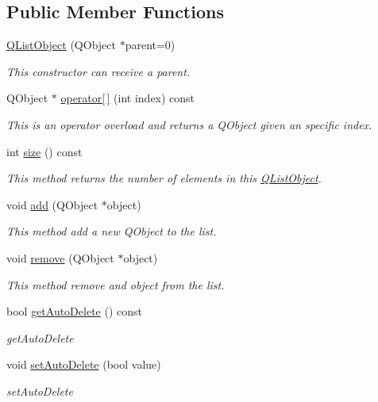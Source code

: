 \subsection*{Public Member Functions}
\begin{DoxyCompactItemize}
\item 
\mbox{\hyperlink{class_q_list_object_a83076620d8a83ebb0d2b2a4a8bd84e38}{Q\+List\+Object}} (Q\+Object $\ast$parent=0)
\begin{DoxyCompactList}\small\item\em This constructor can receive a parent. \end{DoxyCompactList}\item 
Q\+Object $\ast$ \mbox{\hyperlink{class_q_list_object_a6f07490df1b1ba2ed37c7f322e12017b}{operator\mbox{[}$\,$\mbox{]}}} (int index) const
\begin{DoxyCompactList}\small\item\em This is an operator overload and returns a Q\+Object given an specific index. \end{DoxyCompactList}\item 
int \mbox{\hyperlink{class_q_list_object_a4ded55097ea08fa5781240883a591216}{size}} () const
\begin{DoxyCompactList}\small\item\em This method returns the number of elements in this \mbox{\hyperlink{class_q_list_object}{Q\+List\+Object}}. \end{DoxyCompactList}\item 
void \mbox{\hyperlink{class_q_list_object_ad5e960eabd3e9b7d49228ea7549a9bd7}{add}} (Q\+Object $\ast$object)
\begin{DoxyCompactList}\small\item\em This method add a new Q\+Object to the list. \end{DoxyCompactList}\item 
void \mbox{\hyperlink{class_q_list_object_af6bc1883142f976bfd3e82c9d0c030bb}{remove}} (Q\+Object $\ast$object)
\begin{DoxyCompactList}\small\item\em This method remove and object from the list. \end{DoxyCompactList}\item 
bool \mbox{\hyperlink{class_q_list_object_ad9d1f7e3c9f2563bcded31b02edc06fb}{get\+Auto\+Delete}} () const
\begin{DoxyCompactList}\small\item\em get\+Auto\+Delete \end{DoxyCompactList}\item 
void \mbox{\hyperlink{class_q_list_object_a6c30632fb46f8f7d404f77a9fea49bee}{set\+Auto\+Delete}} (bool value)
\begin{DoxyCompactList}\small\item\em set\+Auto\+Delete \end{DoxyCompactList}\end{DoxyCompactItemize}


